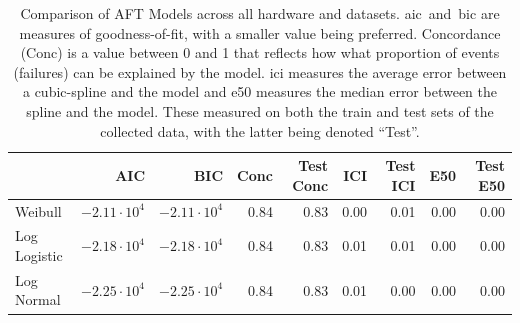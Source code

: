 \documentclass[sn-mathphys-num]{sn-jnl}%
\begin{document}
\begin{table}
\centering
\caption{
    Comparison of AFT Models across all hardware and datasets.
    \acrshort{aic}~and~\acrshort{bic} are measures of goodness-of-fit, with a smaller value being preferred.
    Concordance (Conc) is a value between 0 and 1 that reflects how what proportion of events (failures) can be explained by the model.
    \acrshort{ici} measures the average error between a cubic-spline and the model and \acrshort{e50} measures the median error between the spline and the model.
    These measured on both the train and test sets of the collected data, with the latter being denoted ``Test''.}
\label{tab:aft_summary}
\begin{tabular}{lrrrrrrrr}
\toprule
             & AIC              & BIC & Conc & Test Conc & ICI & Test ICI & E50 & Test E50 \\
\midrule
Weibull      & $-2.11\cdot10^4$ & $-2.11\cdot10^4$ & 0.84 & 0.83 & 0.00 & 0.01 & 0.00 & 0.00 \\
Log Logistic & $-2.18\cdot10^4$ & $-2.18\cdot10^4$ & 0.84 & 0.83 & 0.01 & 0.01 & 0.00 & 0.00 \\
Log Normal   & $-2.25\cdot10^4$ & $-2.25\cdot10^4$ & 0.84 & 0.83 & 0.01 & 0.00 & 0.00 & 0.00 \\
\bottomrule
\end{tabular}
\end{table}
\end{document}
